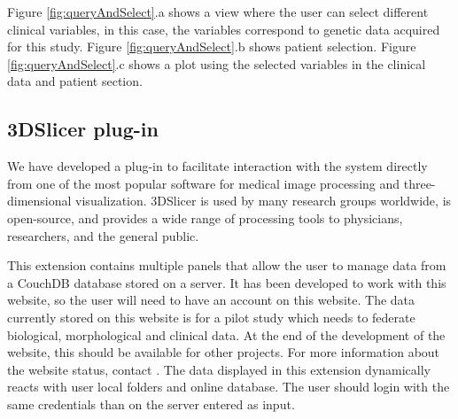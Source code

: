 \documentclass[]{spie}  %
\begin{document}
Figure \ref{fig:queryAndSelect}.a shows a view where the user can select different clinical variables, in this case, the variables correspond to genetic data
acquired for this study. Figure \ref{fig:queryAndSelect}.b shows patient selection. Figure \ref{fig:queryAndSelect}.c shows a plot using the selected 
variables in the clinical data and patient section. 

\subsection{3DSlicer plug-in}

We have developed a plug-in to facilitate interaction with the system 
directly from one of the most popular software for medical image processing and three-dimensional visualization. 
3DSlicer is used by many research groups worldwide, is open-source, and provides a wide range 
of processing tools to physicians, researchers, and the general public. 



This extension contains multiple panels that allow the user to manage data from a CouchDB database stored on a server. It has been developed to work with this website, so the user will need to have an account on this website. The data currently stored on this website is for a pilot study which needs to federate biological, morphological and clinical data. At the end of the development of the website, this should be available for other projects. For more information about the website status, contact .
The data displayed in this extension dynamically reacts with user local folders and online database. The user should login with the same credentials than on the server entered as input.
\end{document}
